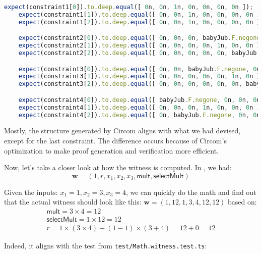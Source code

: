 \documentclass[../lecture-notes.tex]{subfiles}
\begin{document}
    \begin{lstlisting}[language=TypeScript,numbers=none,basicstyle=\scriptsize\ttfamily\scriptsize]
    expect(constraint1[0]).to.deep.equal([ 0n, 0n, 1n, 0n, 0n, 0n, 0n ]);
    expect(constraint1[1]).to.deep.equal([ 0n, 0n, 1n, 0n, 0n, 0n, 0n ]);
    expect(constraint1[2]).to.deep.equal([ 0n, 0n, 1n, 0n, 0n, 0n, 0n ]);

    expect(constraint2[0]).to.deep.equal([ 0n, 0n, 0n, babyJub.F.negone, 0n, 0n, 0n ]);
    expect(constraint2[1]).to.deep.equal([ 0n, 0n, 0n, 0n, 1n, 0n, 0n ]);
    expect(constraint2[2]).to.deep.equal([ 0n, 0n, 0n, 0n, 0n, babyJub.F.negone, 0n ]);

    expect(constraint3[0]).to.deep.equal([ 0n, 0n, babyJub.F.negone, 0n, 0n, 0n, 0n ]);
    expect(constraint3[1]).to.deep.equal([ 0n, 0n, 0n, 0n, 0n, 1n, 0n ]);
    expect(constraint3[2]).to.deep.equal([ 0n, 0n, 0n, 0n, 0n, 0n, babyJub.F.negone ]);

    expect(constraint4[0]).to.deep.equal([ babyJub.F.negone, 0n, 0n, 0n, 0n, 0n, 0n ]);
    expect(constraint4[1]).to.deep.equal([ 0n, 0n, 0n, 1n, 0n, 0n, 0n ]);
    expect(constraint4[2]).to.deep.equal([ 0n, babyJub.F.negone, 0n, 0n, 0n, 0n, 0n ]);
    \end{lstlisting}

    \vspace{0.5cm}

    Mostly, the structure generated by Circom aligns with what we had devised, except for the last constraint.
    The difference occurs because of Circom's optimization to make proof generation and verification more efficient.

    Now, let's take a closer look at how the witness is computed. In , we had:
    \[ \mathbf{w} = (1, r, x_1, x_2, x_3, \mathsf{mult}, \mathsf{selectMult}) \]

    Given the inputs: $x_1 = 1, x_2 = 3, x_3 = 4$, we can quickly do the math
    and find out that the actual witness should look like this: $\mathbf{w} =
    (1, 12, 1, 3, 4, 12, 12)$ based on:
    \begin{gather*}
        \mathsf{mult} = 3 \times 4 = 12 \\
        \mathsf{selectMult} = 1 \times 12 = 12 \\
        r = 1 \times (3 \times 4) + (1 - 1) \times (3 + 4) = 12 + 0 = 12
    \end{gather*}

    Indeed, it aligns with the test from \texttt{test/Math.witness.test.ts}:
\end{document}
